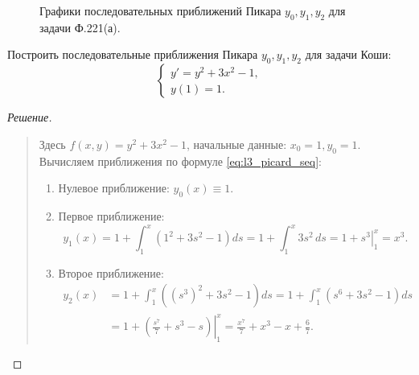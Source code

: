 \begin{figure}[H]
    \centering
    \caption{Графики последовательных приближений Пикара $y_0, y_1, y_2$ для
    задачи Ф.221(а).}
\end{figure}

\begin{problem}[Ф.221(б)]
    Построить последовательные приближения Пикара $y_0, y_1, y_2$ для задачи
    Коши:
    \[
        \begin{cases}
            y' = y^2 + 3x^2 - 1, \\
            y(1) = 1.
        \end{cases}
    \]
\end{problem}

\begin{proof}[Решение]~\\
    \begin{quote}
        Здесь $f(x, y) = y^2 + 3x^2 - 1$, начальные данные: $x_0 = 1, y_0 = 1$.
        Вычисляем приближения по формуле \eqref{eq:l3_picard_seq}:
        \begin{enumerate}
            \item Нулевое приближение: $y_0(x) \equiv 1$.
            \item Первое приближение:
            \[
                y_1(x) = 1 + \int_{1}^{x} \left(1^2 + 3s^2 - 1\right) ds =
                1 + \int_{1}^{x} 3s^2 \, ds = 1 + \left. s^3 \right|_{1}^{x} = x^3.
            \]
            \item Второе приближение:
            \begin{align*}
                y_2(x) &= 1 + \int_{1}^{x} \left((s^3)^2 + 3s^2 - 1\right) ds =
                1 + \int_{1}^{x} \left(s^6 + 3s^2 - 1\right) ds \\
                &= 1 + \left. \left(\frac{s^7}{7} + s^3 - s\right) \right|_{1}^{x}
                = \frac{x^7}{7} + x^3 - x + \frac{6}{7}.
            \end{align*}
        \end{enumerate}
    \end{quote}
\end{proof}

